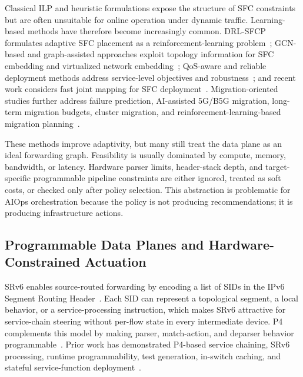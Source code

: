 \documentclass[final,5p]{elsarticle}
\begin{document}
Classical ILP and heuristic formulations expose the structure of SFC constraints but are often unsuitable for online operation under dynamic traffic. Learning-based methods have therefore become increasingly common. DRL-SFCP formulates adaptive SFC placement as a reinforcement-learning problem~\cite{wang2021drl}; GCN-based and graph-assisted approaches exploit topology information for SFC embedding and virtualized network embedding~\cite{xiao2023twostage,pei2025graph,liu2024sfcml}; QoS-aware and reliable deployment methods address service-level objectives and robustness~\cite{taktak2024drl,li2023qosaware,qu2021reliable}; and recent work considers fast joint mapping for SFC deployment~\cite{wu2025drl}. Migration-oriented studies further address failure prediction, AI-assisted 5G/B5G migration, long-term migration budgets, cluster migration, and reinforcement-learning-based migration planning~\cite{zhai2023migration,addad2022ai,qin2023sfcmigrationbudget,afrasiabi2024cluster,zhang2025sfcmigration,hu2026rlpmo}.

These methods improve adaptivity, but many still treat the data plane as an ideal forwarding graph. Feasibility is usually dominated by compute, memory, bandwidth, or latency. Hardware parser limits, header-stack depth, and target-specific programmable pipeline constraints are either ignored, treated as soft costs, or checked only after policy selection. This abstraction is problematic for AIOps orchestration because the policy is not producing recommendations; it is producing infrastructure actions.

\subsection{Programmable Data Planes and Hardware-Constrained Actuation}
\label{subsec:related_pdp}

SRv6 enables source-routed forwarding by encoding a list of SIDs in the IPv6 Segment Routing Header~\cite{filsfils2015segment,rfc8986,rfc9352}. Each SID can represent a topological segment, a local behavior, or a service-processing instruction, which makes SRv6 attractive for service-chain steering without per-flow state in every intermediate device. P4 complements this model by making parser, match-action, and deparser behavior programmable~\cite{jeyakumar2014p4}. Prior work has demonstrated P4-based service chaining, SRv6 processing, runtime programmability, test generation, in-switch caching, and stateful service-function deployment~\cite{stockmayer2020p4sfc,xiang2019p4sc,yang2024p4runpro,ruffy2023p4testgen,zhao2023p4lru,ma2024sfcache,li2024stsfc}.
\end{document}
